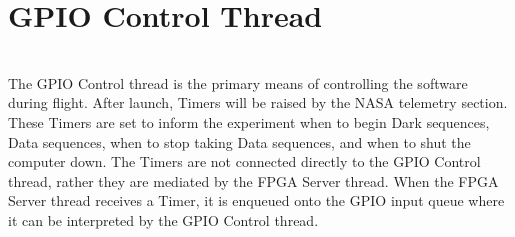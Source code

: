 %
\section{GPIO Control Thread }
\hrulefill
\\
The GPIO Control thread is the primary means of controlling the software during flight. After launch, Timers will be raised by the NASA telemetry section. These Timers are set to inform the experiment when to begin Dark sequences, Data sequences, when to stop taking Data sequences, and when to shut the computer down. The Timers are not connected directly to the GPIO Control thread, rather they are mediated by the FPGA Server thread. When the FPGA Server thread receives a Timer, it is enqueued onto the GPIO input queue where it can be interpreted by the GPIO Control thread.
